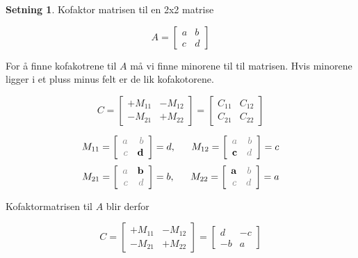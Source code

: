 \documentclass[11pt]{article}
\theoremstyle{definition}
\theoremstyle{definition}
\theoremstyle{definition}
\newtheorem{minset}{Setning}[section]
\newenvironment{fminset}
{\begin{mdframed}[style=minstil]\begin{minset}}
		{\end{minset}\end{mdframed}}
\theoremstyle{definition}
\theoremstyle{definition}
\theoremstyle{definition}
\begin{document}
		\begin{fminset}
			Kofaktor matrisen til en 2x2 matrise
			
			\[A= \left[\begin{array}{rr} 
			a & b \\
			c & d
			\end{array} \right] \]
			
		    For å finne kofakotrene til \(A\) må vi finne minorene til til matrisen. Hvis minorene ligger i et pluss minus felt er de lik kofakotorene.
		    
		    \[C= \left[\begin{array}{rr} 
		    +M_{11} & -M_{12} \\
		    -M_{21} & +M_{22}
		    \end{array} \right] =
		    \left[\begin{array}{rr} 
		    C_{11} & C_{12} \\
		    C_{21} & C_{22}
		    \end{array} \right] \]
		    
		    \[M_{11}=\left[\begin{array}{rr} 
		    \textcolor{gray}{a} & \textcolor{gray}{b} \\
		    \textcolor{gray}{c} & \textbf{d} 
		    \end{array} \right]=d, \hspace{16pt}
		    M_{12}=\left[\begin{array}{rr} 
		    \textcolor{gray}{a} & \textcolor{gray}{b} \\
		    \textbf{c} & \textcolor{gray}{d} 
		    \end{array} \right]=c \]
		    \[M_{21}=\left[\begin{array}{rr} 
		    \textcolor{gray}{a} & \textbf{b} \\
		    \textcolor{gray}{c} & \textcolor{gray}{d} 
		    \end{array} \right]=b, \hspace{16pt}
		    M_{22}=\left[\begin{array}{rr} 
		    \textbf{a} & \textcolor{gray}{b} \\
		    \textcolor{gray}{c} & \textcolor{gray}{d}
		    \end{array} \right]=a \]
			
			Kofaktormatrisen til \(A\) blir derfor
			
			\[C=\left[\begin{array}{rr} 
			+M_{11} & -M_{12} \\
			-M_{21} & +M_{22}
			\end{array} \right]=\left[\begin{array}{rr} 
			d & -c \\
			-b & a
			\end{array} \right]\]
		\end{fminset}
		
\end{document}
